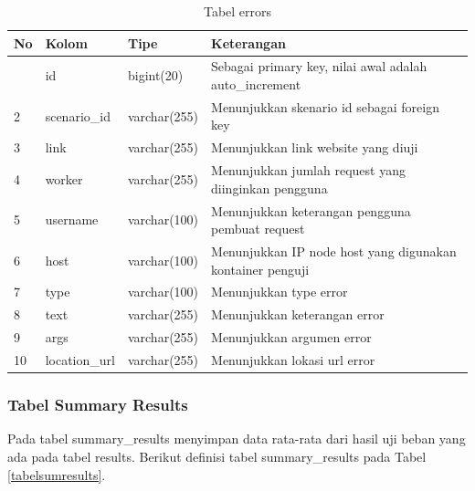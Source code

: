 				\begin{longtable}{|p{}|p{}|p{}|p{}|}
					\caption{Tabel errors} \label{tabelerrors} \\
					\hline
					\textbf{No} & \textbf{Kolom} & \textbf{Tipe} & \textbf{Keterangan} \\ \hline
					\endhead
					\endfoot
					\endlastfoot
					1 & id & bigint(20) & Sebagai primary key, nilai awal adalah auto\_increment \\ \hline
					2 & scenario\_id & varchar(255) & Menunjukkan skenario id sebagai foreign key \\ \hline
					3 & link & varchar(255) & Menunjukkan link website yang diuji \\ \hline
					4 & worker & varchar(255) & Menunjukkan jumlah request yang diinginkan pengguna \\ \hline
					5 & username & varchar(100) & Menunjukkan keterangan pengguna pembuat request \\ \hline
					6 & host & varchar(100) & Menunjukkan IP node host yang digunakan kontainer penguji \\ \hline
					7 & type & varchar(100) & Menunjukkan type error \\ \hline
					8 & text & varchar(255) & Menunjukkan keterangan error \\ \hline
					9 & args & varchar(255) & Menunjukkan argumen error \\ \hline
					10 & location\_url & varchar(255) & Menunjukkan lokasi url error \\ \hline
				\end{longtable}
		
			\subsubsection{Tabel Summary Results}
				Pada tabel summary\_results menyimpan data rata-rata dari hasil uji beban yang ada pada tabel results. Berikut definisi tabel summary\_results pada Tabel \ref{tabelsumresults}.
			
